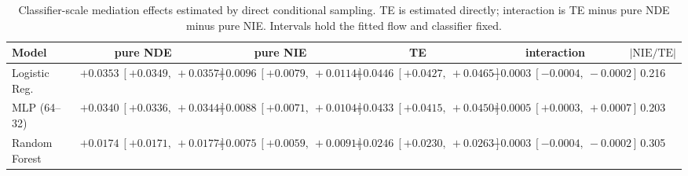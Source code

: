 \begin{table}[htbp]
  \centering
  \caption{Classifier-scale mediation effects estimated by direct conditional sampling. TE is estimated directly; interaction is TE minus pure NDE minus pure NIE. Intervals hold the fitted flow and classifier fixed.}
  \label{tab:german_synth_m0_gap_overall}
  \begin{tabular}{lccccc}
    \toprule
    Model & pure NDE & pure NIE & TE & interaction & $|\mathrm{NIE}/\mathrm{TE}|$ \\
    \midrule
    Logistic Reg. & $+0.0353\ [+0.0349,\ +0.0357]$ & $+0.0096\ [+0.0079,\ +0.0114]$ & $+0.0446\ [+0.0427,\ +0.0465]$ & $-0.0003\ [-0.0004,\ -0.0002]$ & 0.216 \\
    MLP (64--32) & $+0.0340\ [+0.0336,\ +0.0344]$ & $+0.0088\ [+0.0071,\ +0.0104]$ & $+0.0433\ [+0.0415,\ +0.0450]$ & $+0.0005\ [+0.0003,\ +0.0007]$ & 0.203 \\
    Random Forest & $+0.0174\ [+0.0171,\ +0.0177]$ & $+0.0075\ [+0.0059,\ +0.0091]$ & $+0.0246\ [+0.0230,\ +0.0263]$ & $-0.0003\ [-0.0004,\ -0.0002]$ & 0.305 \\
    \bottomrule
  \end{tabular}
\end{table}